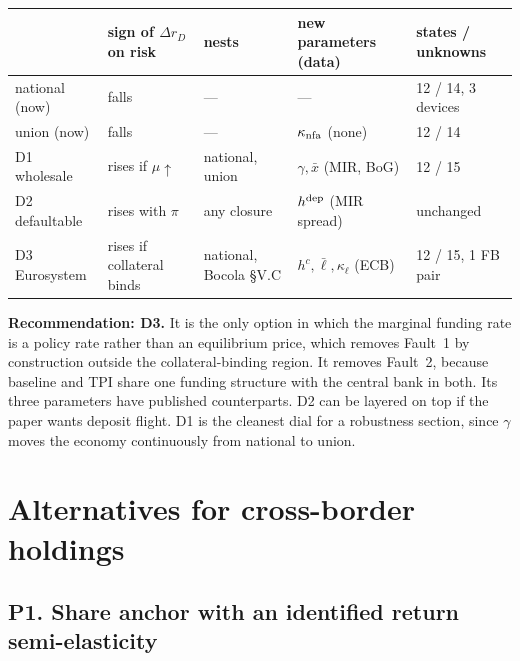 \documentclass[11pt]{article}
\begin{document}
\begin{center}
\small
\begin{tabular}{p{2.6cm}p{2.5cm}p{2.7cm}p{3.5cm}p{3.0cm}}
\toprule
& sign of $\Delta r_D$ on risk & nests & new parameters (data) & states / unknowns\\
\midrule
national (now) & falls & --- & --- & 12 / 14, 3 devices\\
union (now) & falls & --- & $\kappa_{\rm nfa}$ (none) & 12 / 14\\
D1 wholesale & rises if $\mu\uparrow$ & national, union & $\gamma,\bar x$ (MIR, BoG) & 12 / 15\\
D2 defaultable & rises with $\pi$ & any closure & $h^{\rm dep}$ (MIR spread) & unchanged\\
D3 Eurosystem & rises if collateral binds & national, Bocola §V.C & $h^c,\bar\ell,\kappa_\ell$ (ECB) & 12 / 15, 1 FB pair\\
\bottomrule
\end{tabular}
\end{center}

\textbf{Recommendation: D3.} It is the only option in which the marginal funding rate is a
policy rate rather than an equilibrium price, which removes Fault~1 by construction outside the
collateral-binding region. It removes Fault~2, because baseline and TPI share one funding
structure with the central bank in both. Its three parameters have published counterparts. D2
can be layered on top if the paper wants deposit flight. D1 is the cleanest dial for a
robustness section, since $\gamma$ moves the economy continuously from national to union.

\section{Alternatives for cross-border holdings}
\label{sec:port}

\subsection*{P1. Share anchor with an identified return semi-elasticity}
\end{document}
